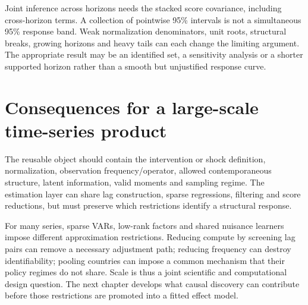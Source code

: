 Joint inference across horizons needs the stacked score covariance,
including cross-horizon terms. A collection of pointwise 95\% intervals
is not a simultaneous 95\% response band. Weak normalization denominators,
unit roots, structural breaks, growing horizons and heavy tails can
each change the limiting argument. The appropriate result may be an
identified set, a sensitivity analysis or a shorter supported horizon
rather than a smooth but unjustified response curve.



\section{Consequences for a large-scale time-series product}
The reusable object should contain the intervention or shock definition,
normalization, observation frequency/operator, allowed contemporaneous
structure, latent information, valid moments and sampling regime.
The estimation layer can share lag construction, sparse regressions,
filtering and score reductions, but must preserve which restrictions
identify a structural response.

For many series, sparse VARs, low-rank factors and shared nuisance
learners impose different approximation restrictions. Reducing compute
by screening lag pairs can remove a necessary adjustment path; reducing
frequency can destroy identifiability; pooling countries can impose a
common mechanism that their policy regimes do not share. Scale is thus
a joint scientific and computational design question. The next chapter
develops what causal discovery can contribute before those restrictions
are promoted into a fitted effect model.





